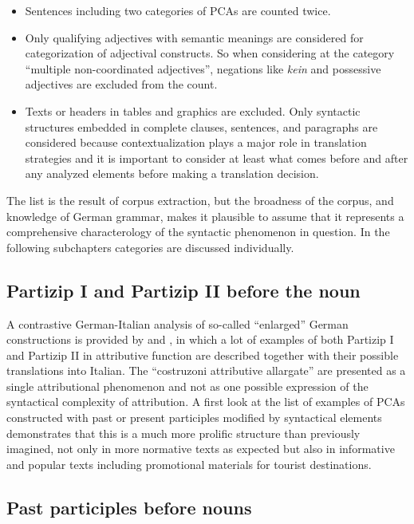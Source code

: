 \documentclass[output=paper,colorlinks,citecolor=brown]{langscibook}
\begin{document}
\begin{itemize}
\item Sentences including two categories of PCAs are counted twice.
\item Only qualifying adjectives with semantic meanings are considered for categorization of adjectival constructs. So when considering at the category “multiple non-coordinated adjectives”, negations like \textit{kein} and possessive adjectives are excluded from the count.
\item Texts or headers in tables and graphics are excluded. Only syntactic structures embedded in complete clauses, sentences, and paragraphs are considered because contextualization plays a major role in translation strategies and it is important to consider at least what comes before and after any analyzed elements before making a translation decision.
\end{itemize}

The list is the result of corpus extraction, but the broadness of the corpus, and knowledge of German grammar, makes it plausible to assume that it represents a comprehensive characterology of the syntactic phenomenon in question. In the following subchapters categories are discussed individually.

\subsection{Partizip I and Partizip II before the noun}\label{sec:4.1}

A contrastive German-Italian analysis of so-called “enlarged” German constructions is provided by \citet[67–73]{Kather2011} and \citet[65–86]{Coletsos2007}, in which a lot of examples of both Partizip I and Partizip II in attributive function are described together with their possible translations into Italian. The “costruzoni attributive allargate” are presented as a single attributional phenomenon and not as one possible expression of the syntactical complexity of attribution. A first look at the list of examples of PCAs constructed with past or present participles modified by syntactical elements demonstrates that this is a much more prolific structure than previously imagined, not only in more normative texts as expected but also in informative and popular texts including promotional materials for tourist destinations.

\subsection{Past participles before nouns}\label{sec:4.1.1}
\end{document}
